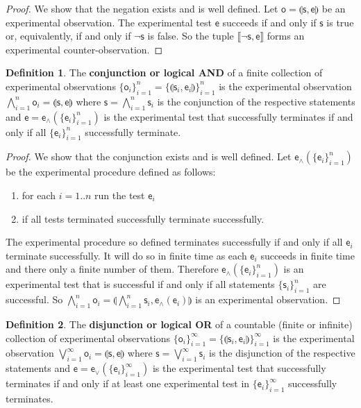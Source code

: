 \documentclass[review]{elsarticle}
\theoremstyle{plain}%
\theoremstyle{definition}
\newtheorem{defn}{Definition}[section]
\theoremstyle{remark}
\begin{document}
\begin{proof}
	We show that the negation exists and is well defined. Let $\mathsf{o}=\llparenthesis \mathsf{s}, \mathsf{e}\rrparenthesis$ be an experimental observation. The experimental test $\mathsf{e}$ succeeds if and only if $\mathsf{s}$ is true or, equivalently, if and only if $\neg \mathsf{s}$ is false. So the tuple $\llbracket\neg \mathsf{s}, \mathsf{e}\rrbracket$ forms an experimental counter-observation.
\end{proof}

\begin{defn}
	The \textbf{conjunction or logical AND} of a finite collection  of experimental observations $\{\mathsf{o}_i\}_{i=1}^{n}=\{\llparenthesis \mathsf{s}_i, \mathsf{e}_i\rrparenthesis\}_{i=1}^{n}$ is the experimental observation $\bigwedge\limits_{i=1}^{n} \mathsf{o}_i = \llparenthesis \mathsf{s}, \mathsf{e}\rrparenthesis$ where $\mathsf{s} = \bigwedge\limits_{i=1}^{n} \mathsf{s}_i$ is the conjunction of the respective statements and $\mathsf{e} = \mathsf{e}_\wedge(\{\mathsf{e}_i\}_{i=1}^{n})$ is the experimental test that successfully terminates if and only if all $\{\mathsf{e}_i\}_{i=1}^{n}$ successfully terminate.
\end{defn}

\begin{proof}
	We show that the conjunction exists and is well defined. Let $\mathsf{e}_\wedge(\{\mathsf{e}_i\}_{i=1}^{n})$ be the experimental procedure defined as follows:
	\begin{enumerate}
	\item for each $i=1..n$ run the test $\mathsf{e}_i$
	\item if all tests terminated successfully terminate successfully.
	\end{enumerate}
	The experimental procedure so defined terminates successfully if and only if all $\mathsf{e}_i$ terminate successfully. It will do so in finite time as each $\mathsf{e}_i$ succeeds in finite time and there only a finite number of them. Therefore $\mathsf{e}_\wedge(\{\mathsf{e}_i\}_{i=1}^{n})$ is an experimental test that is successful if and only if all statements $\{\mathsf{s}_i\}_{i=1}^{n}$ are successful. So $\bigwedge\limits_{i=1}^{n} \mathsf{o}_i = \llparenthesis\bigwedge\limits_{i=1}^{n} \mathsf{s}_i, \mathsf{e}_{\wedge}(\mathsf{e}_i)\rrparenthesis$ is an experimental observation.
\end{proof}

\begin{defn}
	The \textbf{disjunction or logical OR} of a countable (finite or infinite) collection of experimental observations $\{\mathsf{o}_i\}_{i=1}^{\infty}=\{\llparenthesis \mathsf{s}_i, \mathsf{e}_i\rrparenthesis\}_{i=1}^{\infty}$ is the experimental observation $\bigvee\limits_{i=1}^{\infty} \mathsf{o}_i = \llparenthesis \mathsf{s}, \mathsf{e}\rrparenthesis$ where $\mathsf{s} = \bigvee\limits_{i=1}^{\infty} \mathsf{s}_i$ is the disjunction of the respective statements and $\mathsf{e} = \mathsf{e}_\vee(\{\mathsf{e}_i\}_{i=1}^{\infty})$ is the experimental test that successfully terminates if and only if at least one experimental test in $\{\mathsf{e}_i\}_{i=1}^{\infty}$ successfully terminates.
\end{defn}
\end{document}
